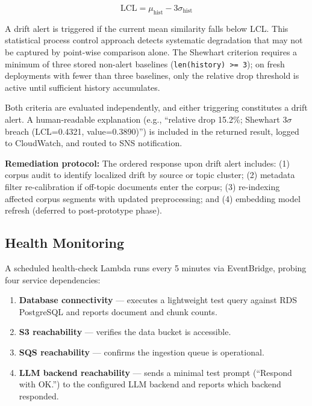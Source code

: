 \begin{equation}
  \text{LCL} = \mu_{\text{hist}} - 3\sigma_{\text{hist}}
  \label{eq:shewhart}
\end{equation}

A drift alert is triggered if the current mean similarity falls below LCL. This statistical process control approach detects systematic degradation that may not be captured by point-wise comparison alone. The Shewhart criterion requires a minimum of three stored non-alert baselines (\texttt{len(history) >= 3}); on fresh deployments with fewer than three baselines, only the relative drop threshold is active until sufficient history accumulates.

Both criteria are evaluated independently, and either triggering constitutes a drift alert. A human-readable explanation (e.g., ``relative drop 15.2\%; Shewhart $3\sigma$ breach (LCL=0.4321, value=0.3890)'') is included in the returned result, logged to CloudWatch, and routed to SNS notification.

\textbf{Remediation protocol:} The ordered response upon drift alert includes: (1) corpus audit to identify localized drift by source or topic cluster; (2) metadata filter re-calibration if off-topic documents enter the corpus; (3) re-indexing affected corpus segments with updated preprocessing; and (4) embedding model refresh (deferred to post-prototype phase).

\subsection{Health Monitoring}

A scheduled health-check Lambda runs every 5 minutes via EventBridge, probing four service dependencies:

\begin{enumerate}[leftmargin=0.5in]
  \item \textbf{Database connectivity} --- executes a lightweight test query against RDS PostgreSQL and reports document and chunk counts.
  \item \textbf{S3 reachability} --- verifies the data bucket is accessible.
  \item \textbf{SQS reachability} --- confirms the ingestion queue is operational.
  \item \textbf{LLM backend reachability} --- sends a minimal test prompt (``Respond with OK.'') to the configured LLM backend and reports which backend responded.
\end{enumerate}

